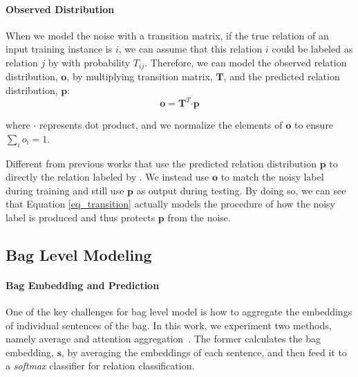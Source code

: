 
\paragraph{Observed Distribution}
When we model the noise with a transition matrix, 
if the true relation of an input training instance is $i$, we can assume that this relation $i$ could be labeled as relation $j$ by \DS  with probability $T_{ij}$. Therefore, we can model the observed relation distribution, $\mathbf{o}$, by
multiplying transition matrix, $\mathbf{T}$, and the predicted relation distribution, $\mathbf{p}$: 
 \begin{equation}
\mathbf{o} = \mathbf{T}^T \bm\cdot \mathbf{p}
\label{eq_transition}
 \end{equation}

where $\bm\cdot$ represents dot product, and we normalize the elements of $\mathbf{o}$ to ensure $\sum_i{o_i}=1$.

Different from previous works that use the predicted relation distribution $\mathbf{p}$ to directly  the relation labeled by \DS. We instead use $\mathbf{o}$ to match the noisy label during training and still use $\mathbf{p}$ as output during testing. 
By doing so, we can see that Equation \ref{eq_transition} actually models the procedure of how the noisy label is produced and thus protects $\mathbf{p}$ from the noise.

\subsection{Bag Level Modeling}
\paragraph{Bag Embedding and Prediction}
One of the key challenges for bag level model is how to aggregate the embeddings of individual sentences of the bag.  
In this work, we experiment two methods, namely average and attention aggregation~\cite{lin2016neural}. 
The former calculates the bag embedding, $\mathbf{s}$, by averaging the embeddings of each sentence, and  then feed it to a \emph{softmax} classifier for relation classification.

